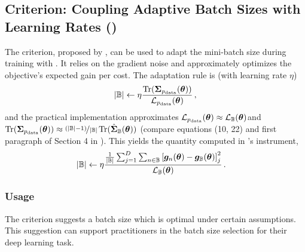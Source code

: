 \subsection{\cabs Criterion: Coupling Adaptive Batch Sizes with Learning Rates
  ()}\label{cockpit::app:cabs}

The \cabs criterion, proposed by \citet{balles2017coupling}, can be used to adapt the
mini-batch size during training with \sgd. It relies on the gradient noise and
approximately optimizes the objective's expected gain per cost. The adaptation
rule is (with learning rate $\eta$)
\begin{equation}
  \label{cockpit::eq:cabs-theoretical}
  |{\mathbb{B}}| \leftarrow \eta \frac{\operatorname{Tr}({\bm{\Sigma}}_{p_{\mathrm{data}}}({\bm{\theta}}))}{{\mathcal{L}}_{{p_{\mathrm{data}}}}({\bm{\theta}})}\,,
\end{equation}
and the practical implementation approximates $ {\mathcal{L}}_{{p_{\mathrm{data}}}}({\bm{\theta}}) \approx
{\mathcal{L}}_{{\mathbb{B}}}({\bm{\theta}})$and $\operatorname{Tr}({\bm{\Sigma}}_{p_{\mathrm{data}}}({\bm{\theta}})) \approx
\nicefrac{(|{\mathbb{B}}|-1)}{|{\mathbb{B}}|} \operatorname{Tr}(\hat{{\bm{\Sigma}}}_{\mathbb{B}}({\bm{\theta}}))$ (compare equations
(10, 22) and first paragraph of Section 4 in \citep{balles2017coupling}). This
yields the quantity computed in \cockpit's  instrument,
\begin{align}
  \label{cockpit::eq:cabs-feature-table}
  |{\mathbb{B}}| &\leftarrow \eta \frac{
          \frac{1}{|{\mathbb{B}}|}
          \sum_{j=1}^D \sum_{n\in{\mathbb{B}}}
          \left[
          {\bm{g}}_n({\bm{\theta}}) - {\bm{g}}_{{\mathbb{B}}}({\bm{\theta}})
          \right]_j^2
          }{
          {\mathcal{L}}_{{\mathbb{B}}}({\bm{\theta}})
          }\,.
\end{align}

\subsubsection{Usage}

The \cabs criterion suggests a batch size which is optimal
under certain assumptions. This suggestion can support practitioners in the
batch size selection for their deep learning task.

